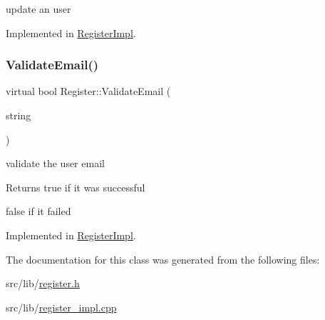 update an user 



Implemented in \hyperlink{classRegisterImpl_a5ae0846ac09fe620501b94f5e05bcd9d}{Register\+Impl}.

\mbox{\label{classRegister_aeeb9ead57f749601459240fc68cfe7b4}} 
\subsubsection{\texorpdfstring{Validate\+Email()}{ValidateEmail()}}
{\footnotesize\ttfamily virtual bool Register\+::\+Validate\+Email (\begin{DoxyParamCaption}\item[{string}]{ }\end{DoxyParamCaption})\hspace{0.3cm}{\ttfamily [pure virtual]}}



validate the user email 

\begin{DoxyReturn}{Returns}
true if it was successful 

false if it failed 
\end{DoxyReturn}


Implemented in \hyperlink{classRegisterImpl_a3c0a7f6df3b0be5ce7fe8d7a78214304}{Register\+Impl}.



The documentation for this class was generated from the following files\+:\begin{DoxyCompactItemize}
\item 
src/lib/\hyperlink{register_8h}{register.\+h}\item 
src/lib/\hyperlink{register__impl_8cpp}{register\+\_\+impl.\+cpp}\end{DoxyCompactItemize}
